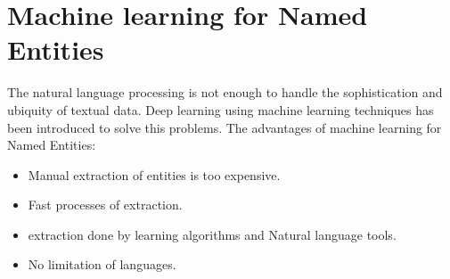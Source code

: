 \section{Machine learning for Named Entities\label{Chapter2}}
The natural language processing is not enough to handle the sophistication and ubiquity of textual data. Deep learning using machine learning techniques has been introduced to solve this problems. The advantages of machine learning for Named Entities:
\begin{itemize}
\item Manual extraction of entities is too expensive.
\item Fast processes of extraction.
\item extraction done by learning algorithms and Natural language tools.
\item No limitation of languages.
\end{itemize}


